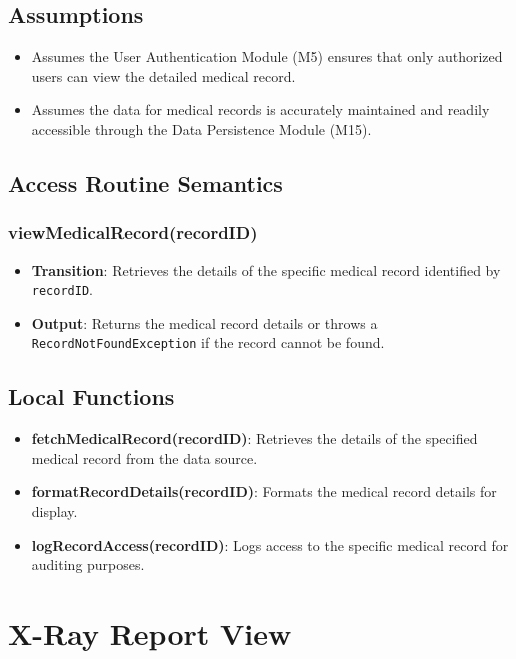 \documentclass[12pt, titlepage]{article}
\begin{document}
\subsection{Assumptions}
\begin{itemize}
    \item Assumes the User Authentication Module (M5) ensures that only authorized users can view the detailed medical record.
    \item Assumes the data for medical records is accurately maintained and readily accessible through the Data Persistence Module (M15).
\end{itemize}


\subsection{Access Routine Semantics}
\subsubsection{viewMedicalRecord(recordID)}
\begin{itemize}
    \item \textbf{Transition}: Retrieves the details of the specific medical record identified by \texttt{recordID}.
    \item \textbf{Output}: Returns the medical record details or throws a \texttt{RecordNotFoundException} if the record cannot be found.
\end{itemize}

\subsection{Local Functions}
\begin{itemize}
\item \textbf{fetchMedicalRecord(recordID)}: Retrieves the details of the specified medical record from the data source.
\item \textbf{formatRecordDetails(recordID)}: Formats the medical record details for display.
\item \textbf{logRecordAccess(recordID)}: Logs access to the specific medical record for auditing purposes.
\end{itemize}

\section{X-Ray Report View}
\end{document}
